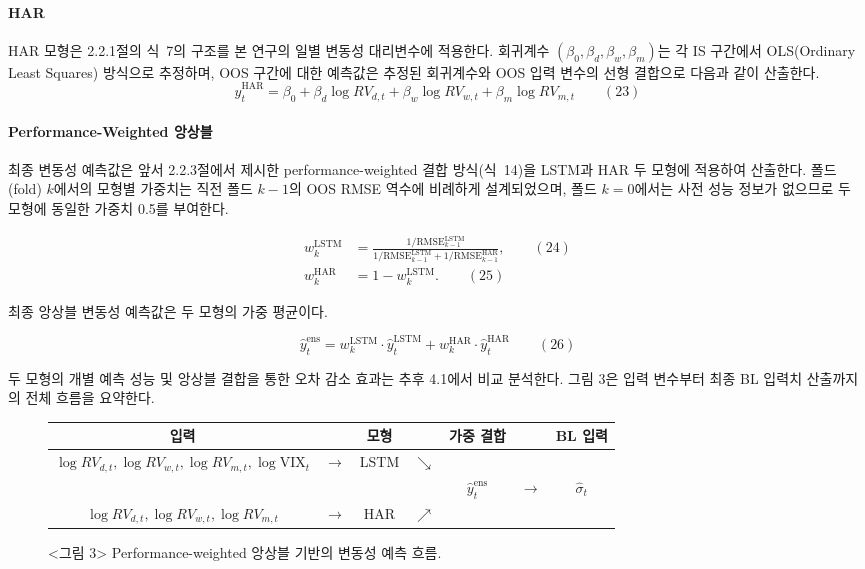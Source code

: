 \documentclass{article}
\begin{document}
\paragraph{HAR}
HAR 모형은 2.2.1절의 식~7의 구조를 본 연구의 일별 변동성 대리변수에 적용한다. 회귀계수
$(\beta_0, \beta_d, \beta_w, \beta_m)$는 각 IS 구간에서 OLS(Ordinary Least Squares) 방식으로 추정하며, OOS 구간에 대한 예측값은 추정된 회귀계수와 OOS 입력 변수의 선형 결합으로 다음과 같이 산출한다.
\begin{equation}
\hat{y}^{\text{HAR}}_t = \beta_0 + \beta_d \log RV_{d,t} + \beta_w \log
RV_{w,t}+ \beta_m \log RV_{m,t} \qquad(23)\end{equation}

\paragraph{Performance-Weighted 앙상블}
최종 변동성 예측값은 앞서 2.2.3절에서 제시한 performance-weighted 결합 방식(식~14)을 LSTM과 HAR 두 모형에 적용하여 산출한다. 폴드(fold) $k$에서의 모형별 가중치는 직전 폴드 $k-1$의 OOS RMSE 역수에 비례하게 설계되었으며, 폴드 $k=0$에서는 사전 성능 정보가 없으므로 두 모형에 동일한 가중치 0.5를 부여한다.

\begin{align}
w_k^{\text{LSTM}} &= \frac{1/\text{RMSE}_{k-1}^{\text{LSTM}}}
{1/\text{RMSE}_{k-1}^{\text{LSTM}} + 1/\text{RMSE}_{k-1}^{\text{HAR}}}, \qquad(24)\\
w_k^{\text{HAR}} &= 1 - w_k^{\text{LSTM}}. \qquad(25)\end{align}

최종 앙상블 변동성 예측값은 두 모형의 가중 평균이다.

\begin{equation}
\hat{y}^{\text{ens}}_t = w_k^{\text{LSTM}} \cdot \hat{y}^{\text{LSTM}}_t
+ w_k^{\text{HAR}} \cdot \hat{y}^{\text{HAR}}_t \qquad(26)\end{equation}

두 모형의 개별 예측 성능 및 앙상블 결합을 통한 오차 감소 효과는 추후 4.1에서 비교 분석한다. 그림 3은 입력 변수부터 최종 BL 입력치 산출까지의 전체 흐름을 요약한다.

\begin{figure}[ht]
\centering
\renewcommand{\arraystretch}{1.4}
\begin{tabular}{c c c c c c c}
\textbf{입력} & & \textbf{모형} & & \textbf{가중 결합} & & \textbf{BL 입력} \\
\hline
$\log RV_{d,t}, \log RV_{w,t}, \log RV_{m,t}, \log \text{VIX}_{t}$ & $\longrightarrow$ & LSTM & $\searrow$ & & & \\
& & & & $\hat{y}^{\text{ens}}_t$& $\longrightarrow$ & $\hat{\sigma}_t$\\
$\log RV_{d,t}, \log RV_{w,t}, \log RV_{m,t}$ & $\longrightarrow$ & HAR & $\nearrow$ & & & \\
\end{tabular}
\caption{<그림 3> Performance-weighted 앙상블 기반의 변동성 예측 흐름.}
\label{fig:ensemble_flow}
\end{figure}
\end{document}

